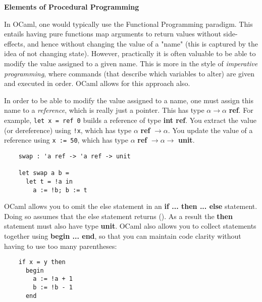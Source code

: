 \documentclass[12pt]{article}
\begin{document}
\begin{center}\LARGE\bf
    Elements of Procedural Programming
\end{center}

In OCaml, one would typically use the Functional Programming paradigm. This entails having pure functions
map arguments to return values without side-effects, and hence without changing the value of a "name" (this
is captured by the idea of not changing state). However, practically it is often valuable to be able to
modify the value assigned to a given name. This is more in the style of \textit{imperative programming},
where commands (that describe which variables to alter) are given and executed in order. OCaml allows for this
approach also.

In order to be able to modify the value assigned to a name, one must assign this name to a \textit{reference},
which is really just a pointer. This has type $\alpha \rightarrow \alpha$ \textbf{ref}. For example,
\texttt{let x = ref 0} builds a reference of type \textbf{int ref}. You extract the value (or dereference) using \texttt{!x},
which has type $\alpha$ \textbf{ref} $\rightarrow \alpha$. You update the value of a reference using \texttt{x := 50}, which
has type $\alpha$ \textbf{ref} $\rightarrow \alpha \rightarrow$ \textbf{unit}.
\begin{lstlisting}
    swap : 'a ref -> 'a ref -> unit

    let swap a b =
      let t = !a in
        a := !b; b := t
\end{lstlisting}

OCaml allows you to omit the else statement in an \textbf{if ... then ... else} statement. Doing so assumes that the
else statement returns (). As a result the \textbf{then} statement must also have type \textbf{unit}. OCaml also allows
you to collect statements together using \textbf{begin ... end}, so that you can maintain code clarity without having to use too many
parentheses:
\begin{lstlisting}
    if x = y then
      begin
        a := !a + 1
        b := !b - 1
      end
\end{lstlisting}
\end{document}
